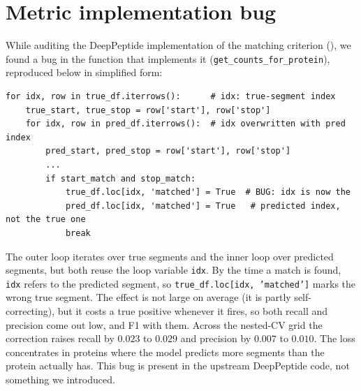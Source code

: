 \documentclass{article}
\begin{document}

\section{Metric implementation bug}
\label{sec:eval-metric}

While auditing the DeepPeptide implementation of the matching criterion (), we found a bug in the function that implements it (\texttt{get\_counts\_for\_protein}), reproduced below in simplified form:

\begin{lstlisting}
for idx, row in true_df.iterrows():      # idx: true-segment index
    true_start, true_stop = row['start'], row['stop']
    for idx, row in pred_df.iterrows():  # idx overwritten with pred index
        pred_start, pred_stop = row['start'], row['stop']
        ...
        if start_match and stop_match:
            true_df.loc[idx, 'matched'] = True  # BUG: idx is now the
            pred_df.loc[idx, 'matched'] = True   # predicted index, not the true one
            break
\end{lstlisting}

The outer loop iterates over true segments and the inner loop over predicted segments, but both reuse the loop variable \texttt{idx}. By the time a match is found, \texttt{idx} refers to the predicted segment, so \texttt{true\_df.loc[idx, 'matched']} marks the wrong true segment. The effect is not large on average (it is partly self-correcting), but it costs a true positive whenever it fires, so both recall and precision come out low, and F1 with them. Across the nested-CV grid the correction raises recall by $0.023$ to $0.029$ and precision by $0.007$ to $0.010$. The loss concentrates in proteins where the model predicts more segments than the protein actually has. This bug is present in the upstream DeepPeptide code, not something we introduced.
\end{document}
